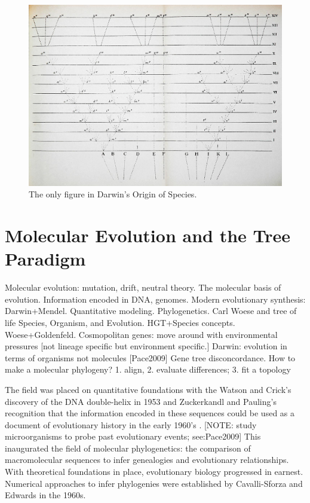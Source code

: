\begin{figure}
\centering
\includegraphics[width=.75\columnwidth]{./fig/introduction/Darwin_divergence.jpg}
\caption[Charles Darwin's Tree]{The only figure in Darwin's Origin of Species.}
\label{fig:darwin_origin}
\end{figure}

\section{Molecular Evolution and the Tree Paradigm}

Molecular evolution: mutation, drift, neutral theory.
The molecular basis of evolution.
Information encoded in DNA, genomes.
Modern evolutionary synthesis: Darwin+Mendel.
Quantitative modeling.
Phylogenetics.
Carl Woese and tree of life
Species, Organism, and Evolution. HGT+Species concepts. Woese+Goldenfeld.
Cosmopolitan genes: move around with environmental pressures [not lineage specific but environment specific.]
Darwin: evolution in terms of organisms not molecules [Pace2009]
Gene tree disconcordance.
How to make a molecular phylogeny? 1. align, 2. evaluate differences; 3. fit a topology

The field was placed on quantitative foundations with the Watson and Crick's discovery of the DNA double-helix in 1953 \cite{Watson:1953wm} and Zuckerkandl and Pauling's recognition that the information encoded in these sequences could be used as a document of evolutionary history in the early 1960's \cite{Zuckerkandl:1962,Zuckerkandl:1965wi}. [NOTE: study microorganisms to probe past evolutionary events; see:Pace2009]
This inaugurated the field of molecular phylogenetics: the comparison of macromolecular sequences to infer genealogies and evolutionary relationships.
With theoretical foundations in place, evolutionary biology progressed in earnest.
Numerical approaches to infer phylogenies were established by Cavalli-Sforza and Edwards in the 1960s.

